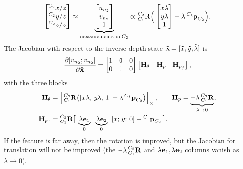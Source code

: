 \begin{align}
\begin{bmatrix} {}^{C_2}x/z \\ {}^{C_2}y/z \\ {}^{C_2}z/z \end{bmatrix} \approx \underbrace{\begin{bmatrix} u_{n_2} \\ v_{n_2} \\ 1 \end{bmatrix}}_{\text{measurements in } C_2} \propto {}^{C_2}_{C_1}\boldsymbol{\mathbf{R}}\Big(\begin{bmatrix} x\lambda \\ y\lambda \\ 1 \end{bmatrix} - \lambda\,{}^{C_1}\boldsymbol{\mathbf{p}}_{C_2}\Big).
\end{align}
The Jacobian with respect to the inverse-depth state $\tilde{\boldsymbol{\mathbf{x}}} = [\tilde x,\tilde y,\tilde\lambda]$ is
\begin{align}
\frac{\partial[u_{n_2};v_{n_2}]}{\partial\tilde{\boldsymbol{\mathbf{x}}}}
= \begin{bmatrix} 1 & 0 & 0 \\ 0 & 1 & 0 \end{bmatrix}\begin{bmatrix} \boldsymbol{\mathbf{H}}_\theta & \boldsymbol{\mathbf{H}}_p & \boldsymbol{\mathbf{H}}_{p_f} \end{bmatrix},
\end{align}
with the three blocks
\begin{align}
\boldsymbol{\mathbf{H}}_\theta &= \left\lfloor{}^{C_2}_{C_1}\boldsymbol{\mathbf{R}}\big([x\lambda;\,y\lambda;\,1] - \lambda\,{}^{C_1}\boldsymbol{\mathbf{p}}_{C_2}\big)\right\rfloor_{\times}, \qquad
\boldsymbol{\mathbf{H}}_p = \underbrace{-\lambda\,{}^{C_2}_{C_1}\boldsymbol{\mathbf{R}}}_{\lambda\to0}, \\
\boldsymbol{\mathbf{H}}_{p_f} &= {}^{C_2}_{C_1}\boldsymbol{\mathbf{R}}\big[\,\underbrace{\lambda\boldsymbol{\mathbf{e}}_1}_{0} \;\; \underbrace{\lambda\boldsymbol{\mathbf{e}}_2}_{0} \;\; [x;\,y;\,0]-{}^{C_1}\boldsymbol{\mathbf{p}}_{C_2}\,\big].
\end{align}
If the feature is far away, then the rotation is improved, but the Jacobian for translation will not be improved (the $-\lambda\,{}^{C_2}_{C_1}\boldsymbol{\mathbf{R}}$ and $\lambda\boldsymbol{\mathbf{e}}_1,\lambda\boldsymbol{\mathbf{e}}_2$ columns vanish as $\lambda\to0$).

